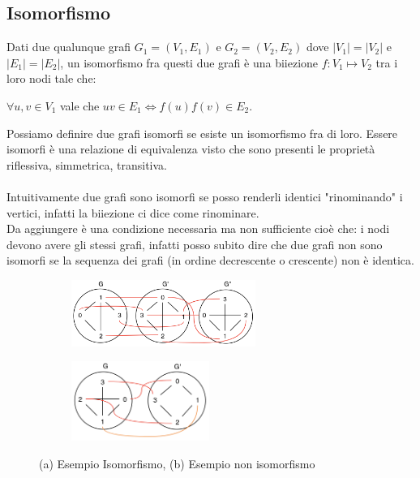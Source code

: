 \subsection{Isomorfismo}
\begin{definition}[Isomorfismo]
    Dati due qualunque grafi $G_1 = (V_1, E_1)$ e $G_2 = (V_2, E_2)$ dove $\lvert V_1\rvert = \lvert V_2\rvert$ e $\lvert E_1\rvert = \lvert E_2\rvert$, un isomorfismo fra questi due  grafi è una biiezione $f: V_1 \mapsto V_2$ tra i loro nodi tale che:
    \begin{center}
        \vspace{-5pt}
        $\forall u,v \in V_1$ vale che $uv \in E_1 \Longleftrightarrow f(u)f(v) \in E_2$.
    \end{center}
\end{definition}
\hspace{-15pt}Possiamo definire due grafi isomorfi se esiste un isomorfismo fra di loro. Essere isomorfi è una relazione di equivalenza visto che sono presenti le proprietà riflessiva, simmetrica, transitiva.\\\\
Intuitivamente due grafi sono isomorfi se posso renderli identici "rinominando" i vertici, infatti la biiezione ci dice come rinominare.\\
Da aggiungere è una condizione necessaria ma non sufficiente cioè che: i nodi devono avere gli stessi grafi, infatti posso subito dire che due grafi non sono isomorfi se la sequenza dei grafi (in ordine decrescente o crescente) non è identica.
\begin{figure}[h!]
    \vspace{-5pt}
    \centering
    \begin{subfigure}{.3\textwidth}
        \centering
        \includegraphics[width=6cm]{images/esempio-isomorfismo.png}
        \vspace{-8pt}
        \caption{}
    \end{subfigure}
    \hspace{3cm}
    \begin{subfigure}{.3\textwidth}
        \centering
        \includegraphics[width=4.5cm]{images/es-non-isomorfmismo.png}
        \vspace{-5pt}
        \caption{}
    \end{subfigure}
    \vspace{-5pt}
    \caption{(a) Esempio Isomorfismo, (b) Esempio non isomorfismo}
\end{figure}

